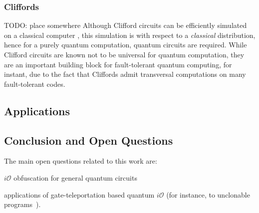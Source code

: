 \subsubsection{Cliffords} TODO: place somewhere 
Although Clifford circuits can be efficiently simulated on a classical computer \cite{Got98}, this simulation is with respect to a \emph{classical} distribution, hence for a purely quantum computation, quantum circuits are required. While Clifford circuits are known not to be universal for quantum computation, they are an important building block for fault-tolerant quantum computing, for instant, due to the fact that Cliffords admit transversal computations on many fault-tolerant codes\cite{BCL+06}.






\subsection{Applications}


\subsection{Conclusion and Open Questions}

The main open questions related to this work are:

$i\mathcal{O}$ obfuscation for general quantum circuits

applications of gate-teleportation based quantum $i\mathcal{O}$ (for instance, to unclonable programs~\cite{Aar09}).


